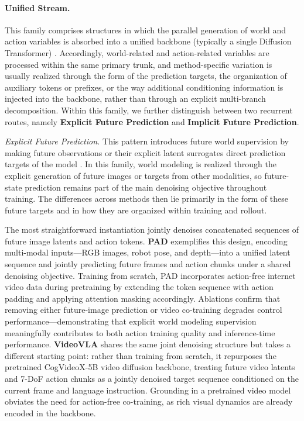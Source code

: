 \paragraph{\textbf{Unified Stream.}}
\label{sec:single-dit}
This family comprises structures in which the parallel generation of world and action variables is absorbed into a unified backbone (typically a single Diffusion Transformer) \cite{PAD,VideoVLA,DreamZero,UWM,FLARE,FRAPPE,CosmosPolicy}. Accordingly, world-related and action-related variables are processed within the same primary trunk, and method-specific variation is usually realized through the form of the prediction targets, the organization of auxiliary tokens or prefixes, or the way additional conditioning information is injected into the backbone, rather than through an explicit multi-branch decomposition. Within this family, we further distinguish between two recurrent routes, namely \textbf{Explicit Future Prediction} and \textbf{Implicit Future Prediction}.

\textcolor{openmossblue}{\textit{Explicit Future Prediction.}}
This pattern introduces future world supervision by making future observations or their explicit latent surrogates direct prediction targets of the model \cite{PAD,VideoVLA,DreamZero,UWM,CosmosPolicy}. In this family, world modeling is realized through the explicit generation of future images or targets from other modalities, so future-state prediction remains part of the main denoising objective throughout training. The differences across methods then lie primarily in the form of these future targets and in how they are organized within training and rollout.



The most straightforward instantiation jointly denoises concatenated sequences of future image latents and action tokens. 
\textbf{PAD} \cite{PAD} exemplifies this design, encoding multi-modal inputs—RGB images, robot pose, and depth—into a unified latent sequence and jointly predicting future frames and action chunks under a shared denoising objective. Training from scratch, PAD incorporates action-free internet video data during pretraining by extending the token sequence with action padding and applying attention masking accordingly. Ablations confirm that removing either future-image prediction or video co-training degrades control performance—demonstrating that explicit world modeling supervision meaningfully contributes to both action training quality and inference-time performance.
\textbf{VideoVLA} \cite{VideoVLA} shares the same joint denoising structure but takes a different starting point: rather than training from scratch, it repurposes the pretrained CogVideoX-5B \cite{CogVideoX} video diffusion backbone, treating future video latents and 7-DoF action chunks as a jointly denoised target sequence conditioned on the current frame and language instruction. Grounding in a pretrained video model obviates the need for action-free co-training, as rich visual dynamics are already encoded in the backbone.

